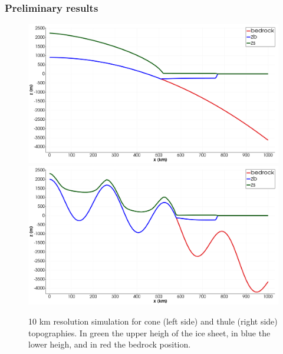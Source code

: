 \documentclass[11pt]{beamer}
\begin{document}
\begin{frame}
	\frametitle{Preliminary results}
\begin{center}
	\begin{figure}[!h]
		\centering
		\includegraphics[width=0.45\linewidth]{../fig/cone_grounding_line.png}
		\includegraphics[width=0.45\linewidth]{../fig/thule_grounding_line.png}
		\caption{10 km resolution simulation for cone (left side) and thule (right side) topographies. In green the upper heigh of the ice sheet, in blue the lower heigh, and in red the bedrock position.}
		\label{10kmsimulation}
	\end{figure}
\end{center}
\end{frame}
\end{document}
